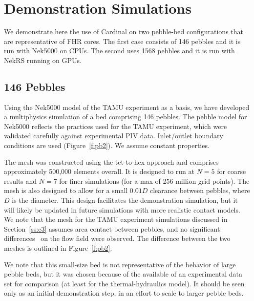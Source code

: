 \section{Demonstration Simulations}
\label{s:demo}

We demonstrate here the use of Cardinal on two pebble-bed configurations
that are representative of FHR cores.  The first case consists of 146
pebbles and it is run with Nek5000 on CPUs. The second uses 1568 pebbles and it is run with NekRS running on GPUs.

\subsection{146 Pebbles}
\label{ss:c4}

Using the Nek5000 model of the TAMU experiment as a basis, we have developed a
multiphysics simulation of a bed comprising 146 pebbles.  The pebble model for
Nek5000 reflects the practices used for the TAMU experiment, which were
validated carefully against experimental PIV data. Inlet/outlet boundary
conditions are used (Figure~\ref{f:pb2}). We assume constant properties.

The mesh was constructed using the tet-to-hex approach and comprises approximately 500,000 elements overall. It is designed to run at $N=5$ for coarse results and $N=7$ for finer simulations (for a max of 256 million grid points). The mesh is also designed to allow for a small $0.01D$ clearance between pebbles, where $D$ is the diameter. This design facilitates the demonstration simulation, but it will likely be updated in future simulations with more realistic contact models. We note that the mesh for the TAMU experiment simulations discussed in Section~\ref{ss:c3} assumes area contact between pebbles, and no significant differences \ on the flow field were observed. The difference between the two meshes is outlined in Figure~\ref{f:pb2}.

We note that this small-size bed is not representative of the behavior of large pebble beds,
but it was chosen because of the available of an experimental data set for comparison (at least for the thermal-hydraulics model). It should be seen only as an initial demonstration step, in an effort to scale to larger pebble beds.

